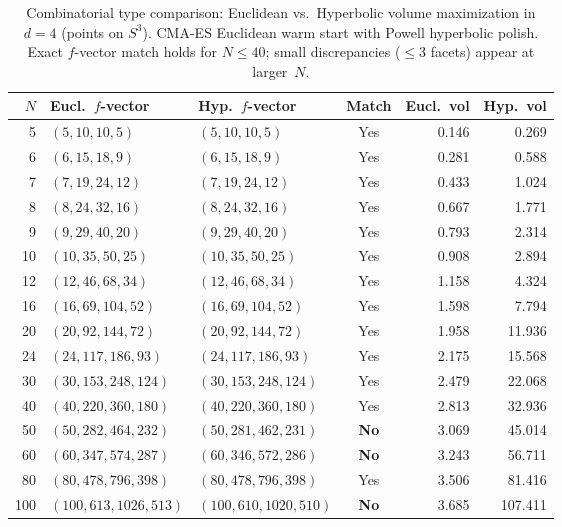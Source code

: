 \documentclass[11pt]{article}
\begin{document}
\begin{table}[ht]
\centering
\caption{Combinatorial type comparison: Euclidean vs.\ Hyperbolic volume maximization in $d = 4$ (points on $S^3$).
CMA-ES Euclidean warm start with Powell hyperbolic polish.
Exact $f$-vector match holds for $N \leq 40$; small discrepancies
($\leq 3$ facets) appear at larger~$N$.}
\label{tab:comb_d4}
\smallskip
\begin{tabular}{r l l c r r}
\toprule
$N$ & Eucl.\ $f$-vector & Hyp.\ $f$-vector & Match & Eucl.\ vol & Hyp.\ vol \\
\midrule
5  & $(5,10,10,5)$     & $(5,10,10,5)$     & Yes & 0.146 & 0.269 \\
6  & $(6,15,18,9)$     & $(6,15,18,9)$     & Yes & 0.281 & 0.588 \\
7  & $(7,19,24,12)$    & $(7,19,24,12)$    & Yes & 0.433 & 1.024 \\
8  & $(8,24,32,16)$    & $(8,24,32,16)$    & Yes & 0.667 & 1.771 \\
9  & $(9,29,40,20)$    & $(9,29,40,20)$    & Yes & 0.793 & 2.314 \\
10 & $(10,35,50,25)$   & $(10,35,50,25)$   & Yes & 0.908 & 2.894 \\
12 & $(12,46,68,34)$   & $(12,46,68,34)$   & Yes & 1.158 & 4.324 \\
16 & $(16,69,104,52)$  & $(16,69,104,52)$  & Yes & 1.598 & 7.794 \\
20 & $(20,92,144,72)$  & $(20,92,144,72)$  & Yes & 1.958 & 11.936 \\
24 & $(24,117,186,93)$ & $(24,117,186,93)$ & Yes & 2.175 & 15.568 \\
30 & $(30,153,248,124)$& $(30,153,248,124)$& Yes & 2.479 & 22.068 \\
\midrule
40 & $(40,220,360,180)$& $(40,220,360,180)$& Yes & 2.813 & 32.936 \\
50 & $(50,282,464,232)$& $(50,281,462,231)$& \textbf{No} & 3.069 & 45.014 \\
60 & $(60,347,574,287)$& $(60,346,572,286)$& \textbf{No} & 3.243 & 56.711 \\
80 & $(80,478,796,398)$& $(80,478,796,398)$& Yes & 3.506 & 81.416 \\
100& $(100,613,1026,513)$& $(100,610,1020,510)$& \textbf{No} & 3.685 & 107.411 \\
\bottomrule
\end{tabular}
\end{table}
\end{document}

